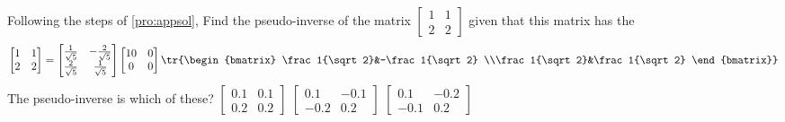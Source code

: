 \begin{activity}
Following the steps of \autoref{pro:appsol}, Find the pseudo-inverse of the matrix {\small\(\begin{bmatrix} 1&1\\2&2 \end{bmatrix}\)} given that this matrix has the \svd
\begin{equation*}
\begin{bmatrix} 1&1\\2&2 \end{bmatrix}
=\begin{bmatrix} \frac1{\sqrt5}&-\frac2{\sqrt5}
\\\frac2{\sqrt5}&\frac1{\sqrt5} \end{bmatrix}
\begin{bmatrix} 10&0\\0&0 \end{bmatrix}
\tr{\begin{bmatrix} \frac1{\sqrt2}&-\frac1{\sqrt2}
\\\frac1{\sqrt2}&\frac1{\sqrt2} \end{bmatrix}}
\end{equation*}
The pseudo-inverse is which of these?
{\(\begin{bmatrix} 0.1&0.1\\0.2&0.2 \end{bmatrix}\)}
{\(\begin{bmatrix} 0.1&-0.1\\-0.2&0.2 \end{bmatrix}\)}
{\(\begin{bmatrix} 0.1&-0.2\\-0.1&0.2 \end{bmatrix}\)}
\end{activity}





